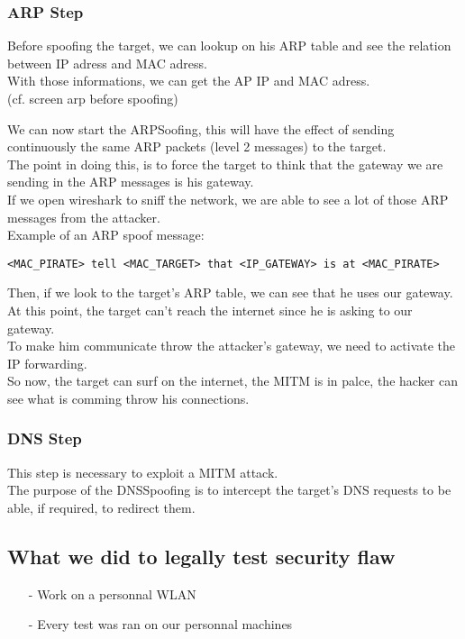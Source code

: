 \documentclass[a4paper, 11pt, oneside]{article}
\begin{document}
\subsubsection{ARP Step}
Before spoofing the target, we can lookup on his ARP table and see the relation between IP adress and MAC adress. \\
With those informations, we can get the AP IP and MAC adress. \\

            (cf. screen arp before spoofing)

We can now start the ARPSoofing, this will have the effect of sending continuously the same ARP packets (level 2 messages) to the target.\\
The point in doing this, is to force the target to think that the gateway we are sending in the ARP messages is his gateway.\\
If we open wireshark to sniff the network, we are able to see a lot of those ARP messages from the attacker.\\

Example of an ARP spoof message: 
\begin{verbatim}
<MAC_PIRATE> tell <MAC_TARGET> that <IP_GATEWAY> is at <MAC_PIRATE>
\end{verbatim}

Then, if we look to the target's ARP table, we can see that he uses our gateway.\\
At this point, the target can't reach the internet since he is asking to our gateway.\\
To make him communicate throw the attacker's gateway, we need to activate the IP forwarding.\\
So now, the target can surf on the internet, the MITM is in palce, the hacker can see what is comming throw his connections.\\

\subsubsection{DNS Step}
This step is necessary to exploit a MITM attack.\\
The purpose of the DNSSpoofing is to intercept the target's DNS requests to be able, if required, to redirect them.\\



\subsection{What we did to legally test security flaw}
\begin{itemize}
    \item[-] Work on a personnal WLAN\\
    \item[-] Every test was ran on our personnal machines\\
\end{itemize}
\end{document}

